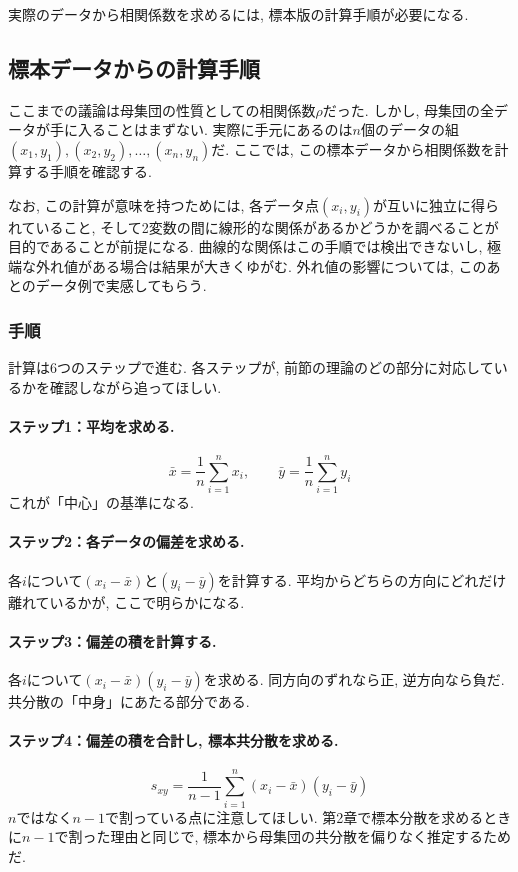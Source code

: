 実際のデータから相関係数を求めるには, 標本版の計算手順が必要になる.


\subsection{標本データからの計算手順}

ここまでの議論は母集団の性質としての相関係数$\rho$だった.
しかし, 母集団の全データが手に入ることはまずない.
実際に手元にあるのは$n$個のデータの組$(x_1, y_1), (x_2, y_2), \ldots, (x_n, y_n)$だ.
ここでは, この標本データから相関係数を計算する手順を確認する.

なお, この計算が意味を持つためには, 各データ点$(x_i, y_i)$が互いに独立に得られていること, そして2変数の間に線形的な関係があるかどうかを調べることが目的であることが前提になる.
曲線的な関係はこの手順では検出できないし, 極端な外れ値がある場合は結果が大きくゆがむ.
外れ値の影響については, このあとのデータ例で実感してもらう.

\subsubsection*{手順}

計算は6つのステップで進む.
各ステップが, 前節の理論のどの部分に対応しているかを確認しながら追ってほしい.

\paragraph{ステップ1：平均を求める.}
\[
\bar{x} = \frac{1}{n} \sum_{i=1}^{n} x_i, \qquad \bar{y} = \frac{1}{n} \sum_{i=1}^{n} y_i
\]
これが「中心」の基準になる.

\paragraph{ステップ2：各データの偏差を求める.}
各$i$について$(x_i - \bar{x})$と$(y_i - \bar{y})$を計算する.
平均からどちらの方向にどれだけ離れているかが, ここで明らかになる.

\paragraph{ステップ3：偏差の積を計算する.}
各$i$について$(x_i - \bar{x})(y_i - \bar{y})$を求める.
同方向のずれなら正, 逆方向なら負だ.
共分散の「中身」にあたる部分である.

\paragraph{ステップ4：偏差の積を合計し, 標本共分散を求める.}
\[
s_{xy} = \frac{1}{n-1} \sum_{i=1}^{n} (x_i - \bar{x})(y_i - \bar{y})
\]
$n$ではなく$n-1$で割っている点に注意してほしい.
第2章で標本分散を求めるときに$n-1$で割った理由と同じで, 標本から母集団の共分散を偏りなく推定するためだ.

